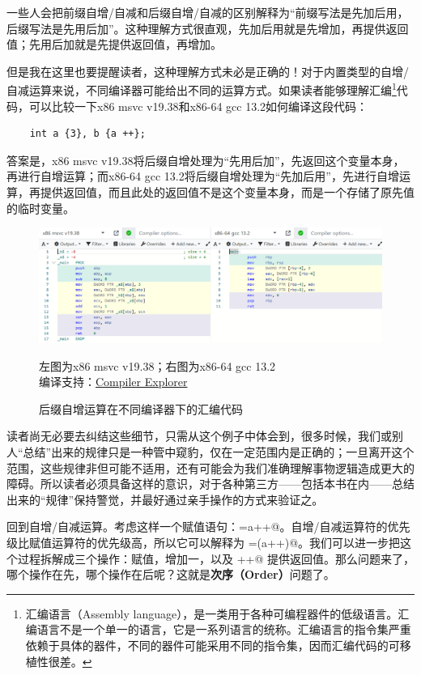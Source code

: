 一些人会把前缀自增/自减和后缀自增/自减的区别解释为``前缀写法是先加后用，后缀写法是先用后加''。这种理解方式很直观，先加后用就是先增加，再提供返回值；先用后加就是先提供返回值，再增加。\par
但是我在这里也要提醒读者，这种理解方式未必是正确的！对于内置类型的自增/自减运算来说，不同编译器可能给出不同的运算方式。如果读者能够理解汇编\footnote{汇编语言（Assembly language），是一类用于各种可编程器件的低级语言。汇编语言不是一个单一的语言，它是一系列语言的统称。汇编语言的指令集严重依赖于具体的器件，不同的器件可能采用不同的指令集，因而汇编代码的可移植性很差。}代码，可以比较一下x86 msvc v19.38和x86-64 gcc 13.2如何编译这段代码：
\begin{lstlisting}
    int a {3}, b {a ++};
\end{lstlisting}
答案是，x86 msvc v19.38将后缀自增处理为``先用后加''，先返回这个变量本身，再进行自增运算；而x86-64 gcc 13.2将后缀自增处理为``先加后用''，先进行自增运算，再提供返回值，而且此处的返回值不是这个变量本身，而是一个存储了原先值的临时变量。\par
\begin{figure}[htbp]
    \centering
    \includegraphics[width=\textwidth]{../images/generalized_parts/03_how_compilers_interpret_postfix_increment.png}
    \caption{后缀自增运算在不同编译器下的汇编代码}
    \footnotesize{左图为x86 msvc v19.38；右图为x86-64 gcc 13.2\\编译支持：\href{https://godbolt.org/}{Compiler Explorer}}
\end{figure}
读者尚无必要去纠结这些细节，只需从这个例子中体会到，很多时候，我们或别人``总结''出来的规律只是一种管中窥豹，仅在一定范围内是正确的；一旦离开这个范围，这些规律非但可能不适用，还有可能会为我们准确理解事物逻辑造成更大的障碍。所以读者必须具备这样的意识，对于各种第三方——包括本书在内——总结出来的``规律''保持警觉，并最好通过亲手操作的方式来验证之。\par
回到自增/自减运算。考虑这样一个赋值语句：\lstinline@b=a++@。自增/自减运算符的优先级比赋值运算符的优先级高，所以它可以解释为 \lstinline@b=(a++)@。我们可以进一步把这个过程拆解成三个操作：赋值，\lstinline@a@ 增加一，以及 \lstinline@a++@ 提供返回值。那么问题来了，哪个操作在先，哪个操作在后呢？这就是\textbf{次序（Order）}问题了。\par
